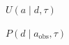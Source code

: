 \documentclass[12pt]{article}
\begin{document}
\begin{preview}
$U(a \mid d, \tau)$
\end{preview}

\begin{preview}
$P(d \mid a_{\mathrm{obs}}, \tau)$
\end{preview}
\end{document}
